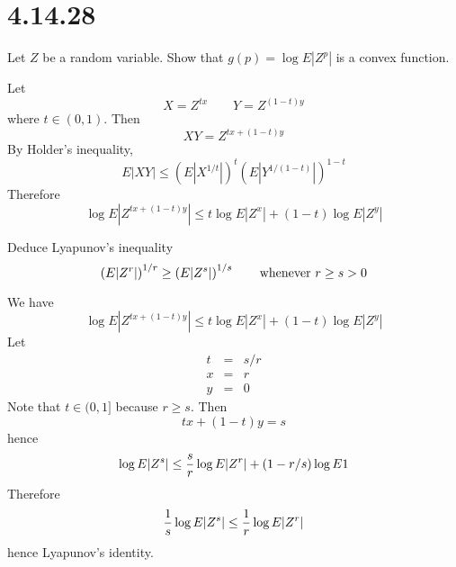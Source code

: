 \section*{4.14.28}
Let $Z$ be a random variable.
Show that $g(p)=\log E|Z^p|$ is a convex function.

\bigskip
\noindent
Let
$$X=Z^{tx}\qquad Y=Z^{(1-t)y}$$
where $t\in(0,1)$. Then
$$XY=Z^{tx+(1-t)y}$$
By Holder's inequality,
$$
E|XY|\le
\left(E|X^{1/t}|\right)^t
\left(E|Y^{1/(1-t)}|\right)^{1-t}
$$
Therefore
$$\log E|Z^{tx+(1-t)y}|
\le t\log E|Z^x|+(1-t)\log E|Z^y|$$

\bigskip
\noindent
Deduce Lyapunov's inequality
$$\left(E|Z^r|\right)^{1/r}\ge
\left(E|Z^s|\right)^{1/s}\qquad
\hbox{whenever $r\ge s>0$}$$

\bigskip
\noindent
We have
$$\log E|Z^{tx+(1-t)y}|
\le t\log E|Z^x|+(1-t)\log E|Z^y|$$
Let
\begin{eqnarray*}
t&=&s/r\\
x&=&r\\
y&=&0
\end{eqnarray*}
Note that $t\in(0,1]$ because $r\ge s$.
Then
$$tx+(1-t)y=s$$
hence
$$\log E|Z^s|\le{s\over r}\log E|Z^r|+(1-r/s)\log E1$$
Therefore
$${1\over s}\log E|Z^s|\le{1\over r}\log E|Z^r|$$
hence Lyapunov's identity.
